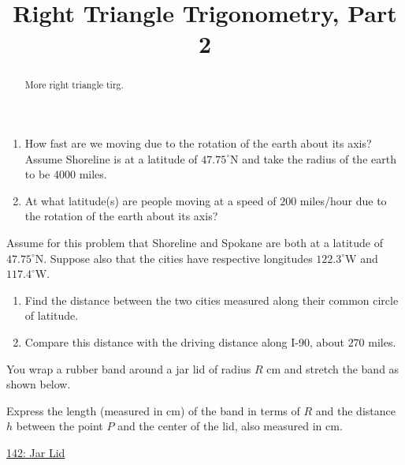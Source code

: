 \documentclass{ximera}
\title{Right Triangle Trigonometry, Part 2}
\begin{document}
\begin{abstract}
More right triangle tirg.
\end{abstract}
\maketitle



\begin{question} \label{Qfksadfsdt4e4}
\begin{enumerate}
\item How fast are we moving due to the rotation of the earth about its axis? Assume Shoreline is at a latitude of $47.75^\circ$N and take the radius of the earth to be $4000$ miles.

\item At what latitude(s) are people moving at a speed of $200$ miles/hour due to the rotation of the earth about its axis?
\end{enumerate}
\end{question}

\begin{question}  \label{QODfefEREr}
Assume for this problem that Shoreline and Spokane are both at a latitude of $47.75^\circ$N. Suppose also that the cities have respective longitudes $122.3^\circ$W and $117.4^\circ$W. 

\begin{enumerate}
\item Find the distance between the two cities measured along their common circle of latitude.

\item Compare this distance with the driving distance along I-90, about $270$ miles.

\end{enumerate}

\end{question}


\begin{question} \label{QdfRERER}
You wrap a rubber band around a jar lid of radius $R$ cm and stretch the band as shown below.

Express the length (measured in cm) of the band in terms of $R$ and the distance $h$ between the point $P$ and the center of the lid, also measured in cm.


\begin{onlineOnly}
    \begin{center}
\end{center}
\end{onlineOnly}

\href{https://www.desmos.com/calculator/wz5qiyj4od}{142: Jar Lid}

\end{question}
\end{document}
